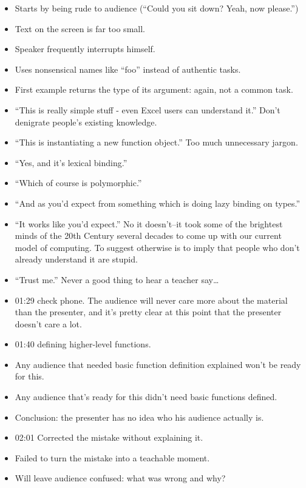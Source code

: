 \documentclass[10pt,statementpaper]{memoir}
\providecommand{\tightlist}{%
  \setlength{\itemsep}{0pt}\setlength{\parskip}{0pt}}
\begin{document}
\begin{itemize}
\tightlist
\item
  Starts by being rude to audience (``Could you sit down? Yeah, now
  please.'')
\item
  Text on the screen is far too small.
\item
  Speaker frequently interrupts himself.
\item
  Uses nonsensical names like ``foo'' instead of authentic tasks.
\item
  First example returns the type of its argument: again, not a common
  task.
\item
  ``This is really simple stuff - even Excel users can understand it.''
  Don't denigrate people's existing knowledge.
\item
  ``This is instantiating a new function object.'' Too much unnecessary
  jargon.
\item
  ``Yes, and it's lexical binding.''
\item
  ``Which of course is polymorphic.''
\item
  ``And as you'd expect from something which is doing lazy binding on
  types.''
\item
  ``It works like you'd expect.'' No it doesn't--it took some of the
  brightest minds of the 20th Century several decades to come up with
  our current model of computing. To suggest otherwise is to imply that
  people who don't already understand it are stupid.
\item
  ``Trust me.'' Never a good thing to hear a teacher say\ldots{}
\item
  01:29 check phone. The audience will never care more about the
  material than the presenter, and it's pretty clear at this point that
  the presenter doesn't care a lot.
\item
  01:40 defining higher-level functions.
\item
  Any audience that needed basic function definition explained won't be
  ready for this.
\item
  Any audience that's ready for this didn't need basic functions
  defined.
\item
  Conclusion: the presenter has no idea who his audience actually is.
\item
  02:01 Corrected the mistake without explaining it.
\item
  Failed to turn the mistake into a teachable moment.
\item
  Will leave audience confused: what was wrong and why?
\end{itemize}
\end{document}
